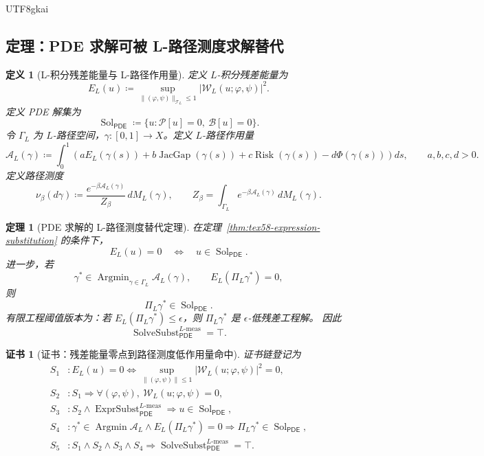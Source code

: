 \documentclass[12pt]{article}
\newtheorem{definition}{定义}[section]
\newtheorem{theorem}{定理}[section]
\newtheorem{Certificate}{证书}[section]
\newcommand{\DefEq}{\coloneqq}
\newcommand{\Pcal}{\mathcal P}
\newcommand{\Bcal}{\mathcal B}
\newcommand{\PDE}{\ensuremath{\mathsf{PDE}}}
\DeclareMathOperator{\Sol}{Sol}
\DeclareMathOperator{\JacGap}{JacGap}
\DeclareMathOperator{\Risk}{Risk}
\DeclareMathOperator{\ExprSubst}{ExprSubst}
\DeclareMathOperator{\SolveSubst}{SolveSubst}
\newcommand{\Lmeas}{L\text{-}\mathrm{meas}}
\DeclareMathOperator*{\Argmin}{Argmin}
\begin{document}
\begin{CJK*}{UTF8}{gkai}
\subsection{定理：PDE 求解可被 L-路径测度求解替代}
\label{subsec:tex58-solve-substitution-theorem}

\begin{definition}[L-积分残差能量与 L-路径作用量]
\label{def:tex58-l-residual-energy-action}
定义 \(L\)-积分残差能量为
\[
  E_L(u)
  \DefEq
  \sup_{\|(\varphi,\psi)\|_{\mathcal T_L}\le 1}
  \left|
  \mathcal W_L(u;\varphi,\psi)
  \right|^2.
\]
定义 PDE 解集为
\[
  \Sol_{\PDE}
  \DefEq
  \{u:\Pcal[u]=0,\ \Bcal[u]=0\}.
\]
令 \(\Gamma_L\) 为 \(L\)-路径空间，\(\gamma:[0,1]\to X\)。定义 \(L\)-路径作用量
\[
  \mathcal A_L(\gamma)
  \DefEq
  \int_0^1
  \left(
  aE_L(\gamma(s))
  +
  b\JacGap(\gamma(s))
  +
  c\Risk(\gamma(s))
  -
  d\Phi(\gamma(s))
  \right)ds,
  \qquad
  a,b,c,d>0.
\]
定义路径测度
\[
  \nu_\beta(d\gamma)
  \DefEq
  \frac{e^{-\beta\mathcal A_L(\gamma)}}{Z_\beta}\,dM_L(\gamma),
  \qquad
  Z_\beta
  =
  \int_{\Gamma_L}e^{-\beta\mathcal A_L(\gamma)}\,dM_L(\gamma).
\]
\end{definition}

\begin{theorem}[PDE 求解的 L-路径测度替代定理]
\label{thm:tex58-solve-substitution}
在定理~\ref{thm:tex58-expression-substitution} 的条件下，
\[
  E_L(u)=0
  \quad\Longleftrightarrow\quad
  u\in\Sol_{\PDE}.
\]
进一步，若
\[
  \gamma^\ast\in\Argmin_{\gamma\in\Gamma_L}\mathcal A_L(\gamma),
  \qquad
  E_L(\Pi_L\gamma^\ast)=0,
\]
则
\[
  \Pi_L\gamma^\ast\in\Sol_{\PDE}.
\]
有限工程阈值版本为：若 \(E_L(\Pi_L\gamma^\ast)\le\epsilon\)，则 \(\Pi_L\gamma^\ast\)
是 \(\epsilon\)-低残差工程解。
因此
\[
  \SolveSubst_{\PDE}^{\Lmeas}=\top.
\]
\end{theorem}

\begin{Certificate}[证书：残差能量零点到路径测度低作用量命中]
\label{cert:tex58-solve-substitution}
证书链登记为
\[
\begin{aligned}
  S_1 &: E_L(u)=0
  \Longleftrightarrow
  \sup_{\|(\varphi,\psi)\|\le1}|\mathcal W_L(u;\varphi,\psi)|^2=0,\\
  S_2 &: S_1\Rightarrow
  \forall(\varphi,\psi),\ \mathcal W_L(u;\varphi,\psi)=0,\\
  S_3 &: S_2\wedge \ExprSubst_{\PDE}^{\Lmeas}
  \Rightarrow u\in\Sol_{\PDE},\\
  S_4 &: \gamma^\ast\in\Argmin\mathcal A_L
  \wedge E_L(\Pi_L\gamma^\ast)=0
  \Rightarrow
  \Pi_L\gamma^\ast\in\Sol_{\PDE},\\
  S_5 &: S_1\wedge S_2\wedge S_3\wedge S_4
  \Rightarrow
  \SolveSubst_{\PDE}^{\Lmeas}=\top.
\end{aligned}
\]
\end{Certificate}


\end{CJK*}
\end{document}
